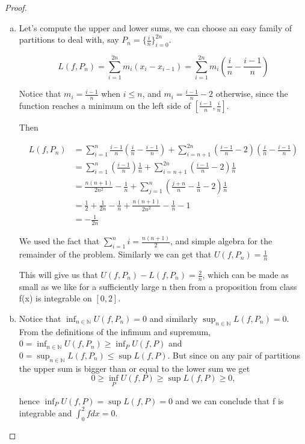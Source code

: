\documentclass[11pt]{article}
\theoremstyle{plain}
\theoremstyle{remark}
\newcommand {\ds}{\displaystyle\sum}
\newcommand {\mbN} {\mathbb N}
\begin{document}
\begin{proof}
	\begin{enumerate}[a.]
	\item Let's compute the upper and lower sums, we can choose an easy family of partitions to deal with, say $P_n=\{\frac i n\}_{i=0}^{2n}$.
	
	\[
	L(f,P_n) = \sum_{i=1}^{2n} m_i (x_i-x_{i-1})=\sum_{i=1}^{2n} m_i (\frac i n - \frac{i-1}{n})
	\]
	
	Notice that $m_i=\frac{i-1}{n}$ when $i\leq n$, and $m_i=\frac{i-1}{n}-2$ otherwise, since the function reaches a minimum on the left side of $[\frac{i-1}{n},\frac i n]$.
	
	Then
	
	\begin{align*}
	L(f,P_n) &= \sum_{i=1}^{n} \frac{i-1}{n} (\frac i n - \frac{i-1}{n}) + \sum_{i=n+1}^{2n} (\frac{i-1}{n} -2) (\frac i n - \frac{i-1}{n})\\
	&= \sum_{i=1}^{n} (\frac{i-1}{n})\frac 1 n +  \sum_{i=n+1}^{2n} (\frac{i-1}{n}-2)\frac 1 n\\
	&= \frac{n(n+1)}{2n^2}-\frac 1 n + \sum_{j=1}^{n} (\frac{j+n}{n}-\frac 1 n -2)\frac 1 n\\
	&=\frac 1 2 +\frac 1 {2n} - \frac 1 n + \frac{n(n+1)}{2n^2}-\frac 1 n -1\\
	&=-\frac 1 {2n}
	\end{align*}
	
	We used the fact that $\ds_{i=1}^n i = \frac{n(n+1)}{2}$, and simple algebra for the remainder of the problem. Similarly we can get that $U(f,P_n)=\frac 1 n$
	
	This will give us that $U(f,P_n)-L(f,P_n)=\frac 2 n$, which can be made as small as we like for a sufficiently large n then from a proposition from class f(x) is integrable on $[0,2]$.
	
	\item Notice that $\displaystyle\inf_{n\in \mbN} U(f,P_n)=0$ and similarly $\displaystyle\sup_{n\in \mbN} L(f,P_n)=0$. From the definitions of the infimum and supremum, $0 = \displaystyle\inf_{n\in \mbN} U(f,P_n)\geq \displaystyle\inf_{P} U(f,P)$ and $0=\displaystyle\sup_{n\in \mbN} L(f,P_n)\leq \sup L(f,P)$. But since on any pair of partitions the upper sum is bigger than or equal to the lower sum we get \[0\geq \inf_{P} U(f,P)\geq \sup L(f,P) \geq 0,\]
	
	hence $\inf_{P} U(f,P)= \sup L(f,P) = 0$ and we can conclude that f is integrable and $\int_0^2 f dx = 0$.
	
	
\end{enumerate}
\end{proof}
\end{document}
